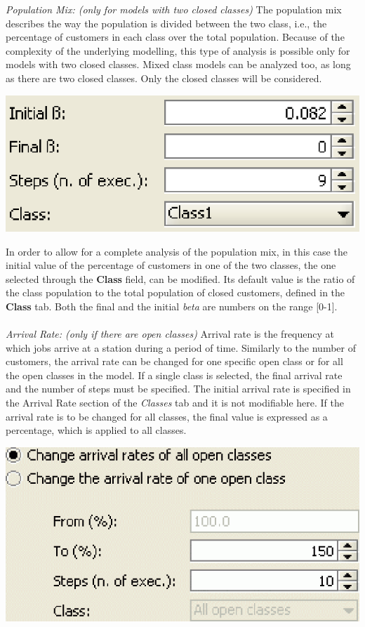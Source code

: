 \begin{description*}
\textit{Population Mix: (only for models with two closed classes)}
The population mix describes the way the population is divided
between the two class, i.e., the percentage of customers in each
class over the total population. Because of the complexity of the
underlying modelling, this type of analysis is possible only for
models with two closed classes. Mixed class models can be analyzed
too, as long as there are two closed classes. Only the closed
classes will be considered.
\begin{center}
\includegraphics[scale=.5]{img/jsim/popmix.eps}
\end{center}
In order to allow for a complete analysis of the population mix, in this case the initial value of the percentage of customers in one of the two classes, the one selected through the \textbf{Class} field, can be modified. Its default value is the ratio of the class population to the total population of closed customers, defined in the \textbf{Class} tab. Both the final and the initial \emph{beta} are numbers on the range [0-1].\\\\
\textit{Arrival Rate: (only if there are open classes)}
Arrival rate is the frequency at which jobs arrive at a station during a period of time.
Similarly to the number of customers, the arrival rate can be changed for one specific open class or for all the open classes in the model. If a single class is selected, the final arrival rate and the number of steps must be specified. The initial arrival rate is specified in the Arrival Rate section of the \textit{Classes} tab and it is not modifiable here.
If the arrival rate is to be changed for all classes, the final value is expressed as a percentage, which is applied to all classes.
\begin{center}
\includegraphics[scale=.5]{img/jsim/ex1.eps}

\end{center}
\end{description*}
